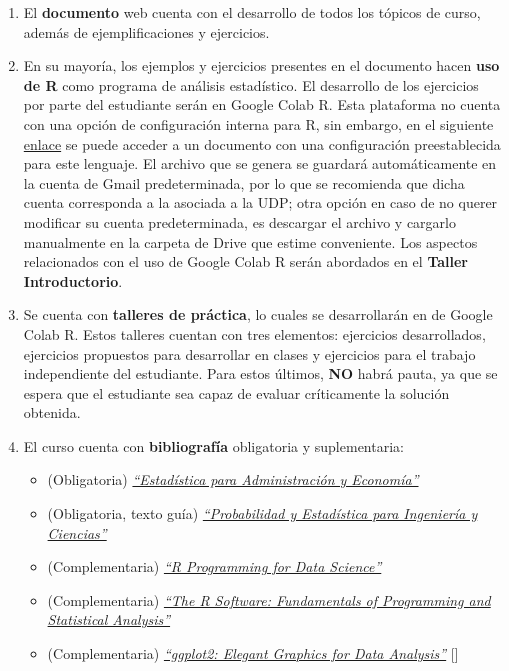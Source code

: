 \documentclass[
]{book}
\begin{document}
\begin{enumerate}
\def\labelenumi{\arabic{enumi}.}
\item
  El \textbf{documento} web cuenta con el desarrollo de todos los tópicos de curso, además de ejemplificaciones y ejercicios.
\item
  En su mayoría, los ejemplos y ejercicios presentes en el documento hacen \textbf{uso de R} como programa de análisis estadístico. El desarrollo de los ejercicios por parte del estudiante serán en Google Colab R. Esta plataforma no cuenta con una opción de configuración interna para R, sin embargo, en el siguiente \href{https://colab.to/r}{enlace} se puede acceder a un documento con una configuración preestablecida para este lenguaje. El archivo que se genera se guardará automáticamente en la cuenta de Gmail predeterminada, por lo que se recomienda que dicha cuenta corresponda a la asociada a la UDP; otra opción en caso de no querer modificar su cuenta predeterminada, es descargar el archivo y cargarlo manualmente en la carpeta de Drive que estime conveniente. Los aspectos relacionados con el uso de Google Colab R serán abordados en el \textbf{Taller Introductorio}.
\item
  Se cuenta con \textbf{talleres de práctica}, lo cuales se desarrollarán en de Google Colab R. Estos talleres cuentan con tres elementos: ejercicios desarrollados, ejercicios propuestos para desarrollar en clases y ejercicios para el trabajo independiente del estudiante. Para estos últimos, \textbf{NO} habrá pauta, ya que se espera que el estudiante sea capaz de evaluar críticamente la solución obtenida.
\item
  El curso cuenta con \textbf{bibliografía} obligatoria y suplementaria:

  \begin{itemize}
  \item
    (Obligatoria) \href{https://github.com/Dfranzani/Bases-de-datos-para-cursos/blob/main/Libros/Anderson\%2C\%20Estad\%C3\%ADstica.pdf}{\emph{``Estadística para Administración y Economía''}} \citep{anderson}
  \item
    (Obligatoria, texto guía) \href{https://github.com/Dfranzani/Bases-de-datos-para-cursos/blob/main/Libros/Devore\%2C\%20Probabilidad\%20y\%20Estad\%C3\%ADstica.pdf}{\emph{``Probabilidad y Estadística para Ingeniería y Ciencias''}} \citep{Devore}
  \item
    (Complementaria) \href{https://bookdown.org/rdpeng/rprogdatascience/}{\emph{``R Programming for Data Science''}} \citep{peng2016r}
  \item
    (Complementaria) \href{https://github.com/Dfranzani/Bases-de-datos-para-cursos/blob/main/Libros/Micheaux\%2C\%20Manual\%20de\%20R.pdf}{\emph{``The R Software: Fundamentals of Programming and Statistical Analysis''}} \citep{deMicheaux2013}
  \item
    (Complementaria) \href{https://ggplot2-book.org/}{\emph{``ggplot2: Elegant Graphics for Data Analysis''}} {[}{]}
  \end{itemize}


\end{enumerate}
\end{document}
